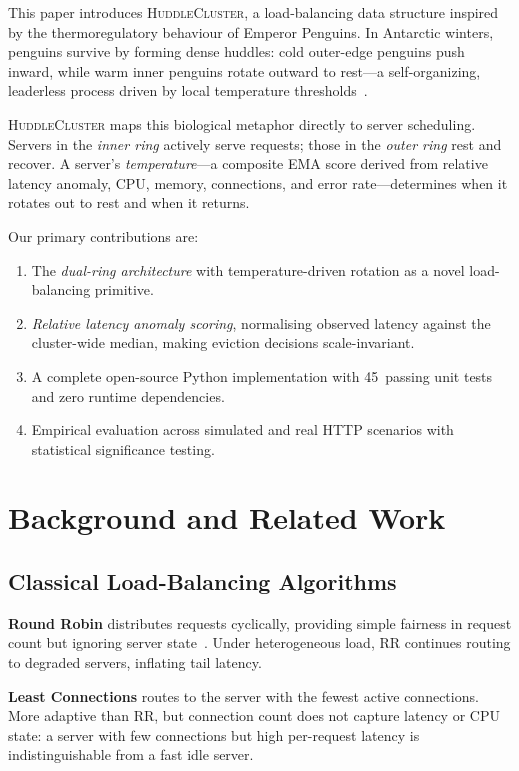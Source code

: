 \documentclass[10pt,twocolumn]{article}
\begin{document}
This paper introduces \textsc{HuddleCluster}, a load-balancing data
structure inspired by the thermoregulatory behaviour of Emperor Penguins.
In Antarctic winters, penguins survive by forming dense huddles: cold
outer-edge penguins push inward, while warm inner penguins rotate
outward to rest---a self-organizing, leaderless process driven by local
temperature thresholds~\cite{zitterbart2011,waters2012}.

\textsc{HuddleCluster} maps this biological metaphor directly to server
scheduling.
Servers in the \emph{inner ring} actively serve requests; those in the
\emph{outer ring} rest and recover.
A server's \emph{temperature}---a composite EMA score derived from
relative latency anomaly, CPU, memory, connections, and error
rate---determines when it rotates out to rest and when it returns.

Our primary contributions are:
\begin{enumerate}
\item The \emph{dual-ring architecture} with temperature-driven rotation
      as a novel load-balancing primitive.
\item \emph{Relative latency anomaly scoring}, normalising observed
      latency against the cluster-wide median, making eviction decisions
      scale-invariant.
\item A complete open-source Python implementation with 45~passing
      unit tests and zero runtime dependencies.
\item Empirical evaluation across simulated and real HTTP scenarios with
      statistical significance testing.
\end{enumerate}

\section{Background and Related Work}
\label{sec:background}

\subsection{Classical Load-Balancing Algorithms}

\textbf{Round Robin} distributes requests cyclically, providing simple
fairness in request count but ignoring server state~\cite{eager1986}.
Under heterogeneous load, RR continues routing to degraded servers,
inflating tail latency.

\textbf{Least Connections} routes to the server with the fewest active
connections.
More adaptive than RR, but connection count does not capture latency or
CPU state: a server with few connections but high per-request latency is
indistinguishable from a fast idle server.
\end{document}
